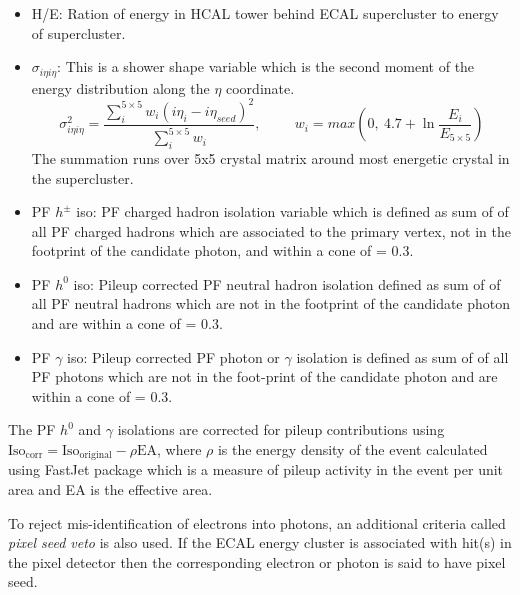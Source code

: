 \begin{itemize}
\item H/E: Ration of energy in HCAL tower behind ECAL supercluster to energy of supercluster.
\item $\sigma_{i\eta i\eta}$: This is a shower shape variable which is the second moment of the energy distribution along the $\eta$ coordinate.
\begin{equation}
\sigma_{i\eta i\eta}^2 = \frac{\sum\limits_{i}^{5\times5}w_i(i\eta_i-i\eta_{seed})^2}{\sum\limits_{i}^{5\times5}w_i}, \hspace{1cm}
w_i = max(0,\ 4.7+\ln\frac{E_i}{E_{5\times5}})
\end{equation}
The summation runs over 5x5 crystal matrix around most energetic crystal in the supercluster.
\item PF $h^\pm$ iso: PF charged hadron isolation variable which is defined as sum of \pt of all PF charged hadrons which are
associated to the primary vertex, not in the footprint of the candidate photon, and within a cone of \dR = 0.3.
\item PF $h^0$ iso: Pileup corrected PF neutral hadron isolation defined as sum of \et of all PF neutral hadrons which are not in the footprint of the candidate photon and are within a cone of \dR = 0.3.
\item PF $\gamma$ iso: Pileup corrected PF photon or $\gamma$ isolation is defined as sum of \et of all PF photons which are not in the foot-print of
the candidate photon and are within a cone of \dR = 0.3.
\end{itemize}
The PF $h^0$ and $\gamma$ isolations are corrected for pileup contributions using $\mathrm{Iso}_{\mathrm{corr}} = \mathrm{Iso}_{\mathrm{original}} - \rho\mathrm{EA}$, where $\rho$ is the energy density of the event calculated using FastJet package \cite{Cacciari:2011ma} which is a measure of pileup activity in the event per unit area and EA is the effective area.

To reject mis-identification of electrons into photons, an additional criteria called \textit{pixel seed veto} is also used. If the ECAL energy cluster is associated with hit(s) in the pixel detector then the corresponding electron or photon is said to have pixel seed. 

